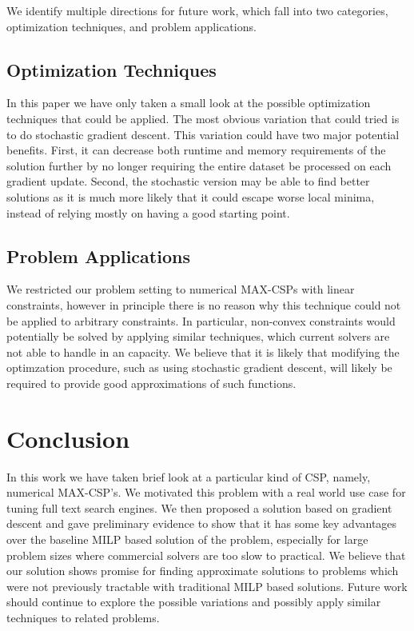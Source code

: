 \documentclass[a4paper]{article}
\begin{document}
We identify multiple directions for future work, which fall into 
two categories, optimization techniques, and problem applications. 

\subsection{Optimization Techniques}

In this paper we have only taken a small look at the possible 
optimization techniques that could be applied. The most obvious 
variation that could tried is to do stochastic gradient descent. This 
variation could have two major potential benefits. First, it can 
decrease both runtime and memory requirements of the solution further by no longer requiring the 
entire dataset be processed on each gradient update. Second, the stochastic 
version may be able to find better solutions as it is much more likely that it 
could escape worse local minima, instead of relying mostly on having a good starting point.


\subsection{Problem Applications}

We restricted our problem setting to numerical MAX-CSPs with linear
constraints, however in principle there is no reason why this technique could
not be applied to arbitrary constraints. In particular, non-convex constraints
would potentially be solved by applying similar techniques, which current
solvers are not able to handle in an capacity. We believe that it is likely
that modifying the optimzation procedure, such as using stochastic gradient
descent, will likely be required to provide good approximations of such
functions.

\section{Conclusion}

In this work we have taken brief look at a particular kind of CSP, namely, 
numerical MAX-CSP's. We motivated this problem with a real world use case for 
tuning full text search engines. We then proposed a solution based on gradient 
descent and gave preliminary evidence to show that it has some key advantages 
over the baseline MILP based solution of the problem, especially for large problem 
sizes where commercial solvers are too slow to practical. We believe that our solution 
shows promise for finding approximate solutions to problems which were not previously tractable
with traditional MILP based solutions. Future work should continue to explore the 
possible variations and possibly apply similar techniques to related problems. 





\end{document}
